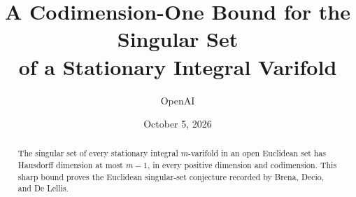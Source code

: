 \documentclass[11pt]{article}
\title{A Codimension-One Bound for the Singular Set\\of a Stationary Integral Varifold}
\author{OpenAI}
\date{October 5, 2026}
\begin{document}
\maketitle
\begin{abstract}
The singular set of every stationary integral $m$-varifold in an open
Euclidean set has Hausdorff dimension at most $m-1$, in every positive
dimension and codimension. This sharp bound proves the Euclidean
singular-set conjecture recorded by Brena, Decio, and De Lellis.
\end{abstract}










\end{document}
